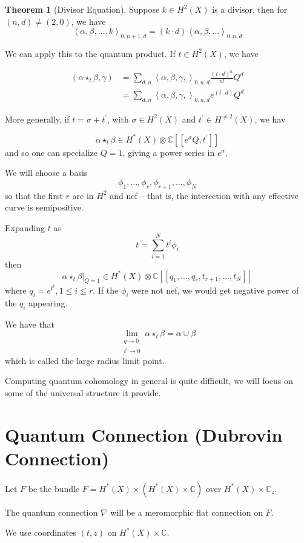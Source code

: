 \documentclass{amsart}
\theoremstyle{definition}
\newtheorem{theorem}[dummy]{Theorem}
\newcommand{\C}{\mathbb{C}}
\begin{document}
\begin{theorem}[Divisor Equation]
Suppose $k\in H^2(X)$ is a divisor, then for $(n,d)\neq (2,0)$, we have
$$\left\langle \alpha,\beta,\dots,k\right\rangle_{0,n+1,d}=(k\cdot d)\left\langle\alpha,\beta,\dots\right\rangle_{0,n,d}$$
\end{theorem}

We can apply this to the quantum product.  If $t\in H^2(X)$, we have

\begin{align*}(\alpha \star_t\beta,\gamma)&=
\sum_{d,n}\left\langle\alpha,\beta,\gamma,\right\rangle_{0,n,d}\frac{(t\cdot d)^n}{n!}Q^d\\
&=\sum_{d,n}\left\langle\alpha,\beta,\gamma,\right\rangle_{0,n,d}e^{(t\cdot d)}Q^d
\end{align*}

More generally, if $t=\sigma+t^\prime$, with $\sigma\in H^2(X)$ and $t^\prime\in H^{\neq 2}(X)$, we hav

$$\alpha\star_t\beta\in H^*(X)\otimes\C[[e^\sigma Q,t^\prime]]$$
and so one can specialize $Q=1$, giving a power series in $e^\sigma$.

We will choose a basis
$$\phi_1,\dots,\phi_r, \phi_{r+1},\dots,\phi_N$$
so that the first $r$ are in $H^2$ and nef -- that is, the interection with any effective curve is semipositive.  

Expanding $t$ as
$$t=\sum_{i=1}^N t^i\phi_i$$
then
$$\alpha\star_t\beta|_{Q=1}\in H^*(X)\otimes\C[[q_1,\dots, q_r, t_{r+1},\dots, t_N]]$$
where $q_i=e^{t^t}, 1\leq i \leq r$.
If the $\phi_i$ were not nef, we would get negative power of the $q_i$ appearing.

We have that $$\lim_{\substack{q\to 0 \\ t^i\to 0}} \alpha\star_t\beta=\alpha\cup\beta$$
which is called the large radius limit point.

Computing quantum cohomology in general is quite difficult, we will focus on some of the universal structure it provide.

\section{Quantum Connection (Dubrovin Connection)}

Let $F$ be the bundle $F=H^*(X)\times\left( H^*(X)\times\C\right)$ over $H^*(X)\times\C_z$.

The quantum connection $\nabla$ will be a meromorphic flat connection on $F$.

We use coordinates $(t,z)$ on $H^*(X)\times \C$.
\end{document}
